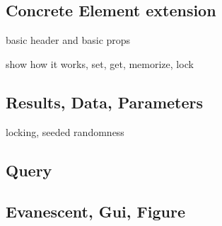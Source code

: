 \documentclass{tufte-handout}
\begin{document}
\subsection{Concrete Element extension}

basic header and basic props

show how it works, set, get, memorize, lock

\subsection{Results, Data, Parameters}

locking, seeded randomness

\subsection{Query}

\subsection{Evanescent, Gui, Figure}

%
%
\end{document}
